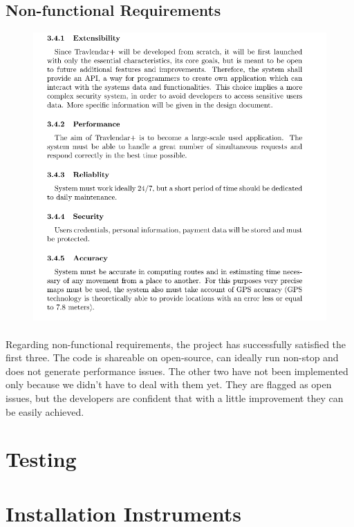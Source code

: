 \documentclass{article}
\begin{document}
		\subsection{Non-functional Requirements}
			\begin{figure}[H]
			\includegraphics[width=\linewidth]{Images/Goals/Non-functional_requirements.png}
			\label{fig:G8}
			\end{figure}
		\paragraph{}Regarding non-functional requirements, the project has successfully satisfied the first three. The code is shareable on open-source, can ideally run non-stop and does not generate performance issues. The other two have not been implemented only because we didn't have to deal with them yet. They are flagged as open issues, but the developers are confident that with a little improvement they can be easily achieved.
\newpage
	\section{Testing}
\newpage
	\section{Installation Instruments}
\end{document}
